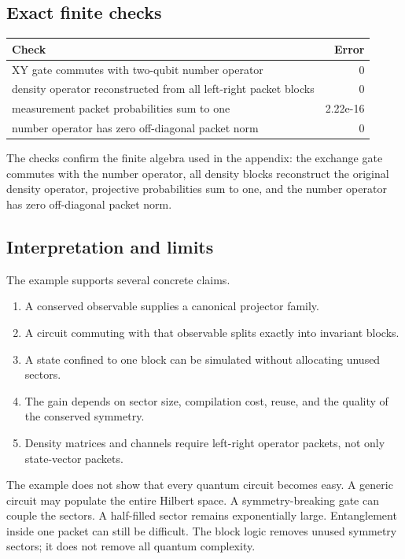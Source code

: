 \documentclass[10pt]{article}
\begin{document}
\subsection{Exact finite checks}

\begin{center}
\small
\begin{tabular}{L{5.9in}r}
\toprule
Check & Error\\
\midrule
XY gate commutes with two-qubit number operator & 0 \\
density operator reconstructed from all left-right packet blocks & 0 \\
measurement packet probabilities sum to one & 2.22e-16 \\
number operator has zero off-diagonal packet norm & 0 \\
\bottomrule
\end{tabular}
\end{center}

The checks confirm the finite algebra used in the appendix: the exchange gate commutes with the number operator, all density blocks reconstruct the original density operator, projective probabilities sum to one, and the number operator has zero off-diagonal packet norm.

\subsection{Interpretation and limits}

The example supports several concrete claims.

\begin{enumerate}[label=(\arabic*)]
\item A conserved observable supplies a canonical projector family.
\item A circuit commuting with that observable splits exactly into invariant blocks.
\item A state confined to one block can be simulated without allocating unused sectors.
\item The gain depends on sector size, compilation cost, reuse, and the quality of the conserved symmetry.
\item Density matrices and channels require left-right operator packets, not only state-vector packets.
\end{enumerate}

The example does not show that every quantum circuit becomes easy.  A generic circuit may populate the entire Hilbert space.  A symmetry-breaking gate can couple the sectors.  A half-filled sector remains exponentially large.  Entanglement inside one packet can still be difficult.  The block logic removes unused symmetry sectors; it does not remove all quantum complexity.
\end{document}
